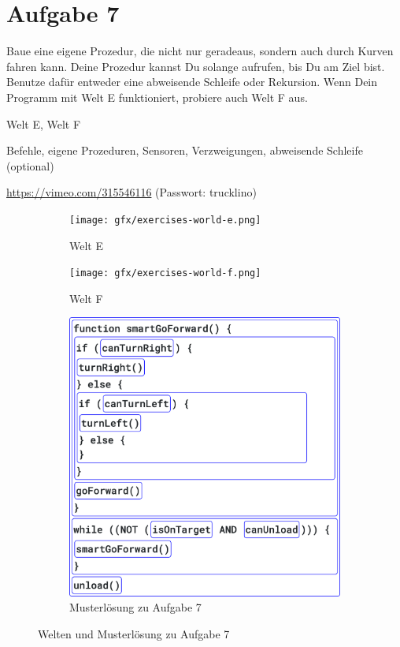 \pagebreak

\section{Aufgabe 7}
\label{sec:exercises:7}

Baue eine eigene Prozedur, die nicht nur geradeaus, sondern auch durch Kurven fahren kann. Deine Prozedur kannst Du solange aufrufen, bis Du am Ziel bist. Benutze dafür entweder eine abweisende Schleife oder Rekursion. Wenn Dein Programm mit Welt E funktioniert, probiere auch Welt F aus.

\begin{description}[noitemsep]
  \item[Welt wählen:] Welt E, Welt F
  \item[Du brauchst:] Befehle, eigene Prozeduren, Sensoren, Verzweigungen, abweisende Schleife (optional)
  \item[Video:] \url{https://vimeo.com/315546116} (Passwort: trucklino)
\end{description}

\begin{figure}[H]
  \begin{subfigure}[b]{0.40\textwidth}
    \texttt{[image: gfx/exercises-world-e.png]}
    \caption{Welt E}
  \end{subfigure}\hfill
  \vspace{0.5cm}
  \begin{subfigure}[b]{0.40\textwidth}
    \texttt{[image: gfx/exercises-world-f.png]}
    \caption{Welt F}
  \end{subfigure}
  \vspace{0.5cm}
  \begin{subfigure}[b]{0.40\textwidth}
    \includegraphics[width=\textwidth]{gfx/exercises-program-7.png}
    \caption{Musterlösung zu Aufgabe 7}
  \end{subfigure}
  \caption{Welten und Musterlösung zu Aufgabe 7}
\end{figure}

